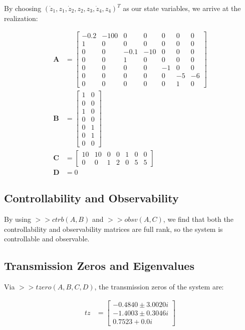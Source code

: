 \documentclass[]{article}
\begin{document}
\noindent By choosing $(\dot{z}_1, z_1, \dot{z}_2, z_2, z_3, \dot{z}_4, z_4)^T$ as our state variables, we arrive at the realization:

\begin{align*}
	\mathbf{A} &= \begin{bmatrix}
	-0.2 & -100 & 0 & 0 & 0 & 0 & 0 \\
	1 & 0 & 0 & 0 & 0 & 0 & 0 \\
	0 & 0 & -0.1 & -10 & 0 & 0 & 0 \\
	0 & 0 & 1 & 0 & 0 & 0 & 0 \\
	0 & 0 & 0 & 0 & -1 & 0 & 0 \\
	0 & 0 & 0 & 0 & 0 & -5 & -6 \\
	0 & 0 & 0 & 0 & 0 & 1 & 0
	\end{bmatrix} \\
	\mathbf{B} &= \begin{bmatrix}
	1 & 0 \\
	0 & 0 \\
	1 & 0 \\
	0 & 0 \\
	0 & 1 \\
	0 & 1 \\
	0 & 0
	\end{bmatrix}\\
	\mathbf{C} &= \begin{bmatrix}
	10 & 10 & 0 & 0 & 1 & 0 & 0 \\
	0 & 0 & 1 & 2 & 0 & 5 & 5
	\end{bmatrix} \\
	\mathbf{D} &= 0
\end{align*}

\subsection{Controllability and Observability}
\noindent By using $>>ctrb(A, B)$ and $>>obsv(A, C)$, we find that both the controllability and observability matrices are full rank, so the system is controllable and observable.

\subsection{Transmission Zeros and Eigenvalues}

\noindent Via $>>tzero(A, B, C, D)$, the transmission zeros of the system are:

\begin{align*}
	tz &= \begin{bmatrix}
	-0.4840 \pm 3.0020i \\
	-1.4003 \pm 0.3046i \\
	0.7523 + 0.0i
	\end{bmatrix}
\end{align*}
\end{document}
